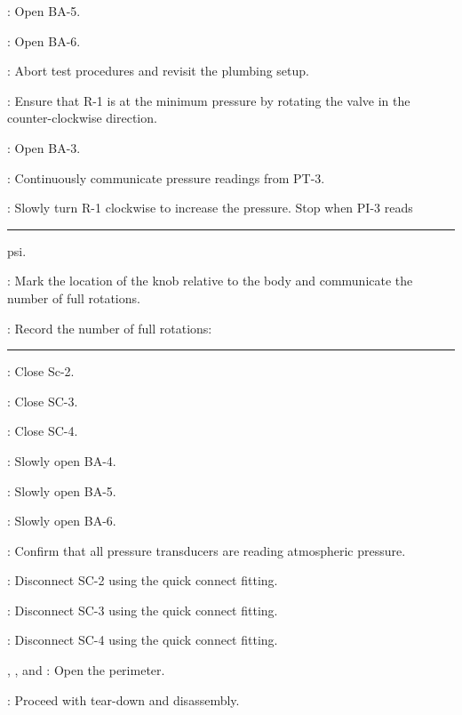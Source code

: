 \begin{checklist}
\begin{checklist}
            \item \primary{}: Open BA-5. 
            \item \primary{}: Open BA-6. 
            \item \ops{}: Abort test procedures and revisit the plumbing setup. 
    \end{checklist}
    \item \primary{}: Ensure that R-1 is at the minimum pressure by rotating the valve in the counter-clockwise direction.
    \item \primary{}: Open BA-3.
    \item \daq{}: Continuously communicate pressure readings from PT-3.
    \item \primary{}: Slowly turn R-1 clockwise to increase the pressure. Stop when PI-3 reads \rule{5em}{0.4pt} psi.
    \item \primary{}: Mark the location of the knob relative to the body and communicate the number of full rotations. 
    \item \ops{}: Record the number of full rotations:\rule{10em}{0.4pt}
    \item \primary{}: Close Sc-2.
    \item \primary{}: Close SC-3.
    \item \primary{}: Close SC-4. 
    \item \primary{}: Slowly open BA-4.
    \item \primary{}: Slowly open BA-5. 
    \item \primary{}: Slowly open BA-6. 
    \item \daq{}: Confirm that all pressure transducers are reading atmospheric pressure.
    \item \primary{}: Disconnect SC-2 using the quick connect fitting.
    \item \primary{}: Disconnect SC-3 using the quick connect fitting.
    \item \primary{}: Disconnect SC-4 using the quick connect fitting.
    \item \peri{}, \perii{}, and \periii{}: Open the perimeter.
    \item \ops{}: Proceed with tear-down and disassembly.
\end{checklist}
\setcounter{checklistnum}{0}

\newpage
